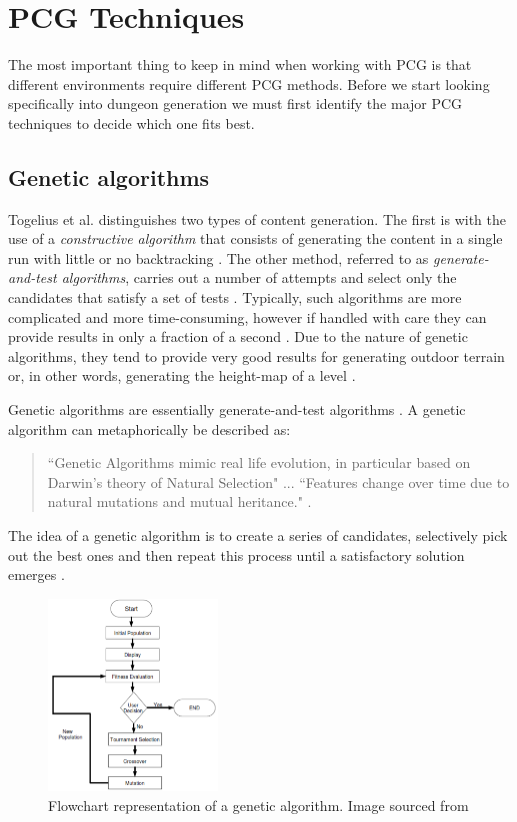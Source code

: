 \chapter{PCG Techniques}
The most important thing to keep in mind when working with PCG is that different environments require different PCG methods. Before we start looking specifically into dungeon generation we must first identify the major PCG techniques to decide which one fits best.

\section{Genetic algorithms}
Togelius et al. distinguishes two types of content generation. The first is with the use of a {\em constructive algorithm} that consists of generating the content in a single run with little or no backtracking \citep{springerlink:10.1007/togelius1}. The other method, referred to as {\em generate-and-test algorithms}, carries out a number of attempts and select only the candidates that satisfy a set of tests \citep{springerlink:10.1007/togelius1}. Typically, such algorithms are more complicated and more time-consuming, however if handled with care they can provide results in only a fraction of a second \citep{DBLP:conf/cig/TogeliusPBWHY10}. Due to the nature of genetic algorithms, they tend to provide very good results for generating outdoor terrain or, in other words, generating the height-map of a level \citep{DBLP:conf/gecco/RaffeZL11}.

Genetic algorithms are essentially generate-and-test algorithms \citep{springerlink:10.1007/togelius1}. A genetic algorithm can metaphorically be described as:
\begin{quote}
``Genetic Algorithms mimic real life evolution, in particular based on Darwin’s theory of Natural Selection" ... ``Features change over time due to natural mutations and mutual heritance." \citep{DBLP:conf/ACMace/MouratoSB11}.
\end{quote}

The idea of a genetic algorithm is to create a series of candidates, selectively pick out the best ones and then repeat this process until a satisfactory solution emerges \citep{DBLP:conf/ACMace/MouratoSB11}.

\begin{figure}[h!]
  \centering
    \includegraphics[width=0.4\textwidth]{images/genetic-flowchart.png}
\caption{Flowchart representation of a genetic algorithm. Image sourced from \citep{DBLP:conf/cec/WalshG10}}
\end{figure}

